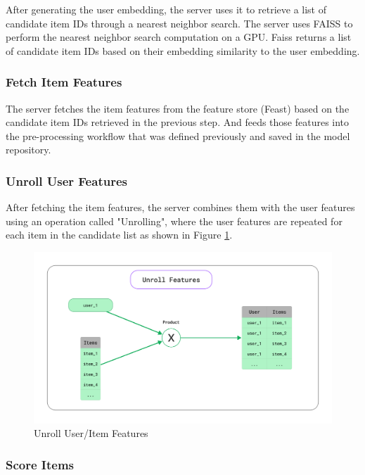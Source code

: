 After generating the user embedding, the server uses it to retrieve a list of candidate item IDs through a nearest neighbor search. 
The server uses FAISS \cite{Faiss} to perform the nearest neighbor search computation on a GPU.
Faiss returns a list of candidate item IDs based on their embedding similarity to the user embedding.

\subsubsection{Fetch Item Features}

The server fetches the item features from the feature store (Feast) based on the candidate item IDs retrieved in the previous step.
And feeds those features into the pre-processing workflow that was defined previously and saved in the model repository.

\subsubsection{Unroll User Features}

After fetching the item features, the server combines them with the user features using an operation called "Unrolling", where the user features are repeated for each item in the candidate list as shown in Figure \ref{fig: UnrollUserFeatures}.

\begin{figure}[H]
    \centering
    \includegraphics[width=\textwidth]{assets/Unroll Features.png}
    \caption{Unroll User/Item Features}
    \label{fig: UnrollUserFeatures}
\end{figure}


\subsubsection{Score Items}

